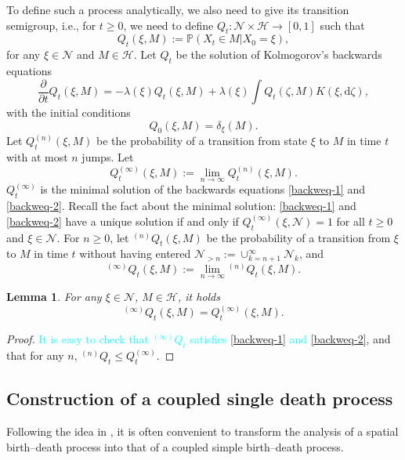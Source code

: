 \documentclass[12pt]{article}
\newtheorem{lma}[thm]{Lemma}
\newcommand{\leftsup}[2]{{}^{#1}\! #2}%
\def\IP{\prob}
\newcommand{\Pro}{\mathbb{P}}
\newcommand{\prob}{\Pro}
\newcounter{con}%
\numberwithin{equation}{section}
\begin{document}
To define such a process analytically, we also need to give its transition semigroup, i.e., for $t\ge0$, we need to define $Q_t:\mathcal{N}\times\mathscr{H}\to[0,1]$ such that 
$$Q_t(\xi,M):=\IP(X_t\in M|X_0=\xi),$$
for any $\xi\in\mathcal{N}$ and $M\in\mathscr{H}$. 
Let $Q_t$ be the solution of Kolmogorov's backwards equations
\begin{equation}\label{backweq-1}
	\frac{\partial}{\partial t}Q_t(\xi,M)=-\lambda(\xi)Q_t(\xi,M)+\lambda(\xi)\int Q_t(\zeta,M)K(\xi,\mathrm{d}\zeta),
\end{equation}
with the initial conditions 
\begin{equation}\label{backweq-2}
Q_0(\xi,M)=\delta_{\xi}(M).
\end{equation}
Let $Q_t^{(n)}(\xi,M)$ be the probability of a transition from state $\xi$ to $M$ in time $t$ with at most $n$ jumps. 
Let 
\begin{equation}
	Q_t^{(\infty)}(\xi,M):=\lim_{n\to\infty}Q_t^{(n)}(\xi,M).
\end{equation}
$Q_t^{(\infty)}$ is the minimal solution of the backwards equations \eqref{backweq-1} and \eqref{backweq-2}.
Recall the fact about the minimal solution: \eqref{backweq-1} and \eqref{backweq-2} have a unique solution if and only if $Q_t^{(\infty)}(\xi,\mathcal{N})=1$ for all $t\ge0$ and $\xi\in\mathcal{N}$. 
For $n\ge0$, let $\leftsup{(n)}{Q_t}(\xi,M)$ be the probability of a transition from $\xi$ to $M$ in time $t$ without having entered $\mathcal{N}_{>n}:=\cup_{k=n+1}^{\infty}\mathcal{N}_k$, and 
$$
\leftsup{(\infty)}{Q_t}(\xi,M):=\lim_{n\to\infty}\leftsup{(n)}{Q_t}(\xi,M).
$$
\begin{lma}\label{lma1}
	For any $\xi\in\mathcal{N}$, $M\in\mathscr{H}$, it holds 
\begin{equation}
	\leftsup{(\infty)}{Q_t}(\xi,M)=Q_t^{(\infty)}(\xi,M).
\end{equation}
\end{lma}
\begin{proof}
	\textcolor{cyan}{It is easy to check that $\leftsup{(\infty)}{Q_t}$ satisfies \eqref{backweq-1} and \eqref{backweq-2}}, and that for any $n$, $\leftsup{(n)}{Q_t}\le Q_t^{(\infty)}$. 
\end{proof}


\subsection{Construction of a coupled single death process}
Following the idea in \cite{Preston75}, it is often convenient to transform the analysis of a spatial birth--death process into that of a coupled simple birth--death process.
\end{document}
